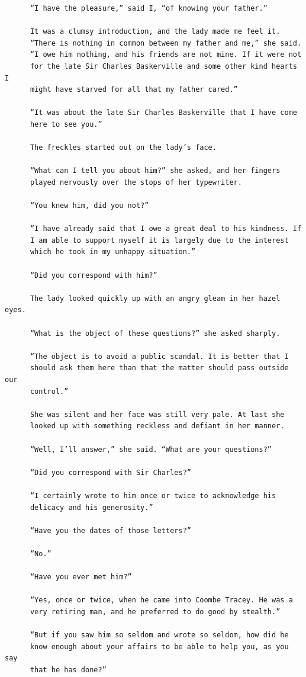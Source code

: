 \documentclass{article}
\begin{document}
\begin{verbatim}
      “I have the pleasure,” said I, “of knowing your father.”

      It was a clumsy introduction, and the lady made me feel it.
      “There is nothing in common between my father and me,” she said.
      “I owe him nothing, and his friends are not mine. If it were not
      for the late Sir Charles Baskerville and some other kind hearts I
      might have starved for all that my father cared.”

      “It was about the late Sir Charles Baskerville that I have come
      here to see you.”

      The freckles started out on the lady’s face.

      “What can I tell you about him?” she asked, and her fingers
      played nervously over the stops of her typewriter.

      “You knew him, did you not?”

      “I have already said that I owe a great deal to his kindness. If
      I am able to support myself it is largely due to the interest
      which he took in my unhappy situation.”

      “Did you correspond with him?”

      The lady looked quickly up with an angry gleam in her hazel eyes.

      “What is the object of these questions?” she asked sharply.

      “The object is to avoid a public scandal. It is better that I
      should ask them here than that the matter should pass outside our
      control.”

      She was silent and her face was still very pale. At last she
      looked up with something reckless and defiant in her manner.

      “Well, I’ll answer,” she said. “What are your questions?”

      “Did you correspond with Sir Charles?”

      “I certainly wrote to him once or twice to acknowledge his
      delicacy and his generosity.”

      “Have you the dates of those letters?”

      “No.”

      “Have you ever met him?”

      “Yes, once or twice, when he came into Coombe Tracey. He was a
      very retiring man, and he preferred to do good by stealth.”

      “But if you saw him so seldom and wrote so seldom, how did he
      know enough about your affairs to be able to help you, as you say
      that he has done?”


\end{verbatim}
\end{document}
